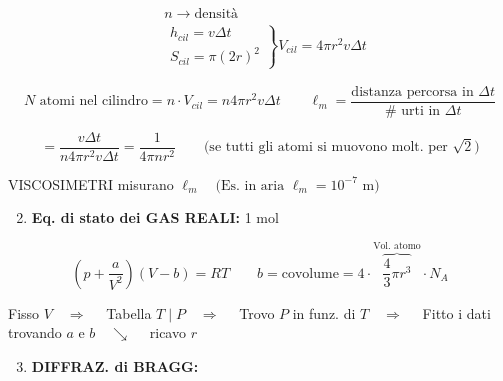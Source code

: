 \documentclass[12pt,a4paper]{article}
\begin{document}
\begin{align*}
    & n \rightarrow \text{densità} \\
    & \left. \begin{matrix} h_{cil} = v \Delta t \\ S_{cil} = \pi(2r)^2 \end{matrix} \right\} V_{cil} = 4\pi r^2 v \Delta t
\end{align*}

\begin{equation*}
    N \text{ atomi nel cilindro} = n \cdot V_{cil} = n 4\pi r^2 v \Delta t \qquad \ell_m = \frac{\text{distanza percorsa in } \Delta t}{\# \text{ urti in } \Delta t}
\end{equation*}

\begin{equation*}
    = \frac{v \Delta t}{n 4\pi r^2 v \Delta t} = \frac{1}{4\pi n r^2} \qquad \text{(se tutti gli atomi si muovono molt. per } \sqrt{2} \text{)}
\end{equation*}

\noindent VISCOSIMETRI misurano $\ell_m \quad \text{(Es. in aria } \ell_m = 10^{-7} \text{ m)}$

\vspace{0.8cm}
\begin{enumerate}
    \setcounter{enumi}{1}
    \item \textbf{Eq. di stato dei GAS REALI:} 1 mol
\end{enumerate}

\begin{equation*}
    \left( p + \frac{a}{V^2} \right)(V - b) = RT \qquad b = \text{covolume} = 4 \cdot \overbrace{\frac{4}{3}\pi r^3}^{\text{Vol. atomo}} \cdot N_A
\end{equation*}

\noindent Fisso $V \quad \Rightarrow \quad$ Tabella $T \mid P \quad \Rightarrow \quad$ Trovo $P$ in funz. di $T \quad \Rightarrow \quad$ Fitto i dati trovando $a$ e $b \quad \searrow \quad$ ricavo $r$

\vspace{0.8cm}
\begin{enumerate}
    \setcounter{enumi}{2}
    \item \textbf{DIFFRAZ. di BRAGG:}
\end{enumerate}

\end{document}
